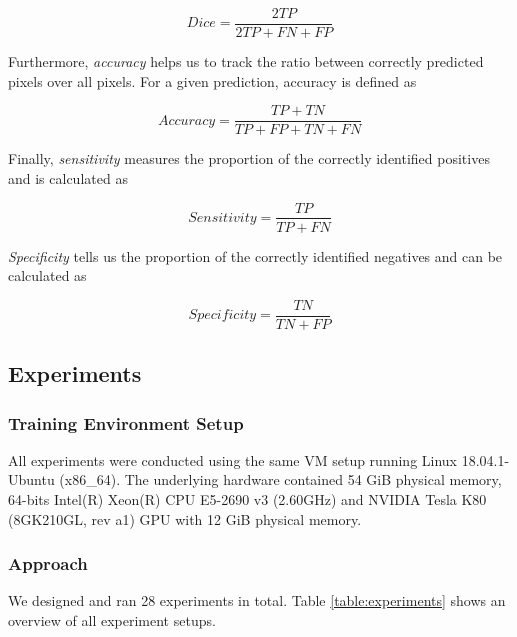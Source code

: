 \begin{equation}
  Dice = \frac{2TP}{2TP + FN + FP}
\end{equation}

Furthermore, \emph{accuracy} helps us to track the ratio between correctly predicted pixels over all pixels. For a given prediction, accuracy is defined as

\begin{equation}
  Accuracy = \frac{TP + TN}{TP + FP + TN + FN}
\end{equation}

Finally, \emph{sensitivity} measures the proportion of the correctly identified positives and is   calculated as

\begin{equation}
  Sensitivity = \frac{TP}{TP + FN}
\end{equation}

\emph{Specificity} tells us the proportion of the correctly identified negatives  and can be calculated as

\begin{equation}
  Specificity = \frac{TN}{TN + FP}
\end{equation}


\subsection{Experiments}

\subsubsection{Training Environment Setup}

All experiments were conducted using the same VM setup running Linux 18.04.1-Ubuntu (x86\_64). The underlying hardware contained 54 GiB physical memory, 64-bits Intel(R) Xeon(R) CPU E5-2690 v3 (2.60GHz) and NVIDIA Tesla K80 (8GK210GL, rev a1) GPU with 12 GiB physical memory.

\subsubsection{Approach}

We designed and ran 28 experiments in total. Table \ref{table:experiments} shows an overview of all experiment setups.

